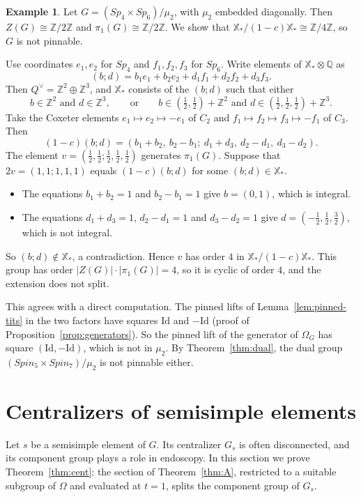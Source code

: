 \documentclass[psamsfonts]{amsart}
\theoremstyle{definition}
\newtheorem{exmp}[thm]{Example}
\theoremstyle{remark}
\numberwithin{equation}{section}
\newcommand{\Z}{\mathbb{Z}}   %
\newcommand{\Q}{\mathbb{Q}}
\newcommand{\X}{\mathbb{X}}
\numberwithin{equation}{section}
\newcommand{\Om}{\Omega}
\newcommand{\Id}{\mathrm{Id}}
\theoremstyle{plain}
\begin{document}
\begin{exmp}\label{exmp:sp4sp6}
Let $G=(Sp_4\times Sp_6)/\mu_2$, with $\mu_2$ embedded diagonally. Then $Z(G)\cong\Z/2\Z$ and $\pi_1(G)\cong\Z/2\Z$. We show that $\X_*/(1-c)\X_*\cong\Z/4\Z$, so $G$ is not pinnable.

Use coordinates $e_1,e_2$ for $Sp_4$ and $f_1,f_2,f_3$ for $Sp_6$. Write elements of $\X_*\otimes\Q$ as
\[
(b;d)=b_1e_1+b_2e_2+d_1f_1+d_2f_2+d_3f_3.
\]
Then $Q^\vee=\Z^2\oplus\Z^3$, and $\X_*$ consists of the $(b;d)$ such that either
\[
b\in\Z^2\text{ and }d\in\Z^3,\qquad\text{or}\qquad b\in(\tfrac12,\tfrac12)+\Z^2\text{ and }d\in(\tfrac12,\tfrac12,\tfrac12)+\Z^3.
\]
Take the Coxeter elements $e_1\mapsto e_2\mapsto-e_1$ of $C_2$ and $f_1\mapsto f_2\mapsto f_3\mapsto-f_1$ of $C_3$. Then
\[
(1-c)(b;d)=(b_1+b_2,\ b_2-b_1;\ d_1+d_3,\ d_2-d_1,\ d_3-d_2).
\]
The element $v=(\frac12,\frac12;\frac12,\frac12,\frac12)$ generates $\pi_1(G)$. Suppose that $2v=(1,1;1,1,1)$ equals $(1-c)(b;d)$ for some $(b;d)\in\X_*$.
\begin{itemize}
\item The equations $b_1+b_2=1$ and $b_2-b_1=1$ give $b=(0,1)$, which is integral.
\item The equations $d_1+d_3=1$, $d_2-d_1=1$ and $d_3-d_2=1$ give $d=(-\frac12,\frac12,\frac32)$, which is not integral.
\end{itemize}
So $(b;d)\notin\X_*$, a contradiction. Hence $v$ has order $4$ in $\X_*/(1-c)\X_*$. This group has order $|Z(G)|\cdot|\pi_1(G)|=4$, so it is cyclic of order $4$, and the extension does not split.

This agrees with a direct computation. The pinned lifts of Lemma~\ref{lem:pinned-tits} in the two factors have squares $\Id$ and $-\Id$ (proof of Proposition~\ref{prop:generators}). So the pinned lift of the generator of $\Om_G$ has square $(\Id,-\Id)$, which is not in $\mu_2$. By Theorem~\ref{thm:dual}, the dual group $(Spin_5\times Spin_7)/\mu_2$ is not pinnable either.
\end{exmp}



\section{Centralizers of semisimple elements}\label{sec:centralizers}

Let $s$ be a semisimple element of $G$. Its centralizer $G_s$ is often disconnected, and its component group plays a role in endoscopy. In this section we prove Theorem~\ref{thm:cent}: the section of Theorem~\ref{thm:A}, restricted to a suitable subgroup of $\Om$ and evaluated at $t=1$, splits the component group of $G_s$.
\end{document}
